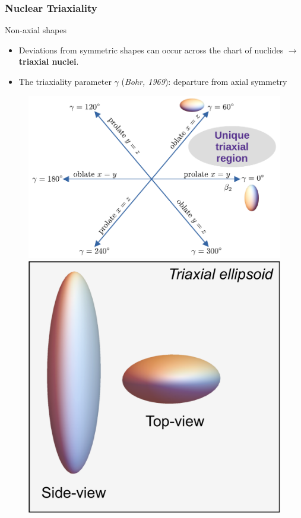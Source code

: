 \documentclass{beamer}
\begin{document}
\begin{frame}
  \frametitle{Nuclear Triaxiality}
  \begin{alertblock}{Non-axial shapes}
    \begin{itemize}
      \item Deviations from symmetric shapes can occur across the chart of nuclides $\to$ \textbf{triaxial nuclei}.
      \item The triaxiality parameter $\gamma$ (\textit{Bohr, 1969}): departure from axial symmetry
    \end{itemize}
  \end{alertblock}
  \begin{figure}
    \centering
    \includegraphics[scale=0.42]{Figs/nice_diagram.pdf}
    \includegraphics[scale=0.19]{Figs/triaxial-shape.pdf}
  \end{figure}
\end{frame}
\end{document}
